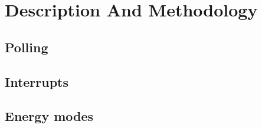 \section{Description And Methodology}

\subsection{Polling}


\subsection{Interrupts}


\subsection{Energy modes} 





